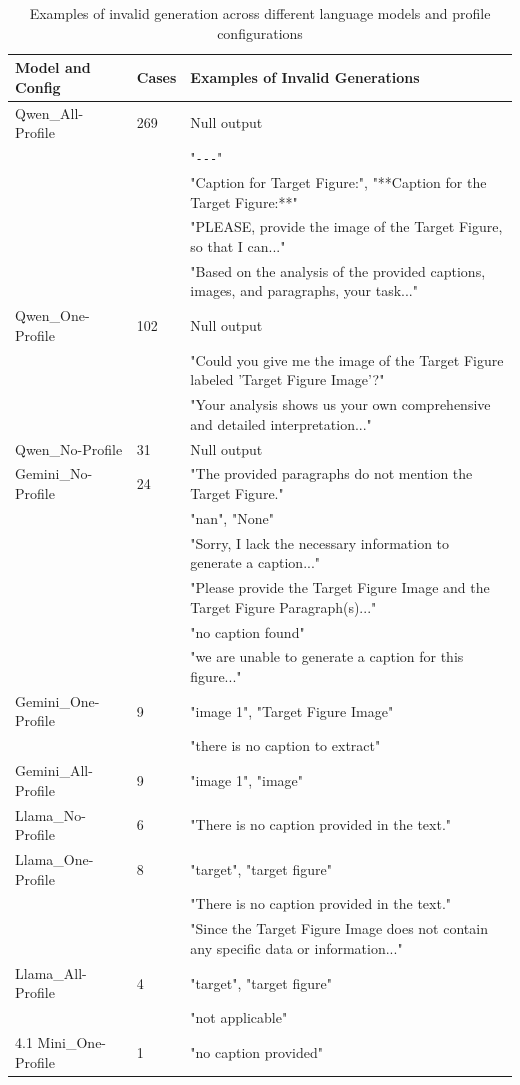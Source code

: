 \begin{table}[t]
\small
\centering

\begin{tabular}{l|l|l}
\hline
\textbf{Model and Config} & \textbf{Cases} & \textbf{Examples of Invalid Generations} \\ \hline
Qwen\_All-Profile & 269 & Null output \\
 &  & "\verb|---|" \\
 &  & "Caption for Target Figure:", "**Caption for the Target Figure:**" \\
 &  & "PLEASE, provide the image of the Target Figure, so that I can..." \\
 &  & "Based on the analysis of the provided captions, images, and paragraphs, your task..." \\ \hline
Qwen\_One-Profile & 102 & Null output \\
 &  & "Could you give me the image of the Target Figure labeled 'Target Figure Image'?" \\
 &  & "Your analysis shows us your own comprehensive and detailed interpretation..." \\ \hline
Qwen\_No-Profile & 31 & Null output \\ \hline
Gemini\_No-Profile & 24 & "The provided paragraphs do not mention the Target Figure." \\
 &  & "nan", "None" \\
 &  & "Sorry, I lack the necessary information to generate a caption..." \\
 &  & "Please provide the Target Figure Image and the Target Figure Paragraph(s)..." \\
 &  & "no caption found" \\
 &  & "we are unable to generate a caption for this figure..." \\ \hline
Gemini\_One-Profile & 9 & "image 1", "Target Figure Image" \\
 &  & "there is no caption to extract" \\ \hline
Gemini\_All-Profile & 9 & "image 1", "image" \\ \hline
Llama\_No-Profile & 6 & "There is no caption provided in the text." \\ \hline
Llama\_One-Profile & 8 & "target", "target figure" \\
 &  & "There is no caption provided in the text." \\
 &  & "Since the Target Figure Image does not contain any specific data or information..." \\ \hline
Llama\_All-Profile & 4 & "target", "target figure" \\
 &  & "not applicable" \\ \hline
4.1 Mini\_One-Profile & 1 & "no caption provided" \\ \hline
\end{tabular}


\caption{Examples of invalid generation across different language models and profile configurations}
\label{tab:generation-error}
\end{table}





